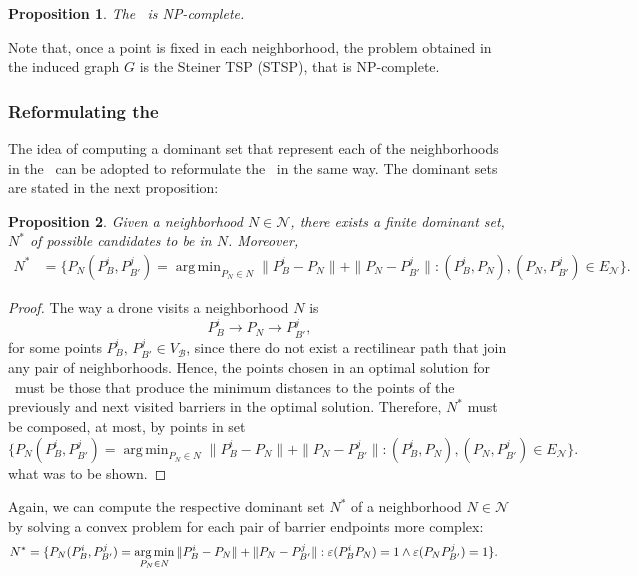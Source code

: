 \documentclass[a4paper]{elsarticle}
\DeclareMathOperator*{\argmin}{arg\,min}
\newcommand{\SPPN}{{\sf{H-SPPN}\xspace }}
\newcommand{\TSPN}{{\sf{H-TSPN}\xspace }}
\newcommand{\VB}{{V^{}_{\mathcal B}}}
\newcommand{\EN}{{E^{}_{\mathcal N}}}
\newtheorem{prop}{Proposition}
\begin{document}
	
	
		\begin{prop}
			The \TSPN \ is NP-complete.
		\end{prop}
		
		Note that, once a point is fixed in each neighborhood, the problem obtained in the induced graph $G$ is the Steiner TSP (STSP), that is NP-complete.
		
	
	\subsubsection{Reformulating the \TSPN}
	The idea of computing a dominant set that represent each of the neighborhoods in the \SPPN \ can be adopted to reformulate the \TSPN \ in the same way. The dominant sets are stated in the next proposition:
	
	\begin{prop}
		Given a neighborhood $N\in\mathcal N$, there exists a finite dominant set, $N^*$ of possible candidates to be in $N$. Moreover,
		\begin{align*}
			N^*&=\{P_N(P_{B}^i, P_{B'}^j)=\argmin_{P_N\in N} \|P_B^i - P_N\| + \|P_N - P_{B'}^j\| :(P_B^i, P_N), (P_N, P_{B'}^j)\in \EN\}.
		\end{align*}
	\end{prop}
	\begin{proof}
		The way a drone visits a neighborhood $N$ is
		$$P_{B}^i\longrightarrow P_N\longrightarrow P_{B'}^j,$$
		for some points $P_B^i,\, P_{B'}^j\in \VB$, since there do not exist a rectilinear path that join any pair of neighborhoods. Hence, the points chosen in an optimal solution for \TSPN \ must be those that produce the minimum distances to the points of the previously and next visited barriers in the optimal solution. Therefore, $N^*$ must be composed, at most, by points in set
		$$
			\{P_N(P_{B}^i, P_{B'}^j)=\argmin_{P_N\in N} \|P_B^i - P_N\| + \|P_N - P_{B'}^j\| :(P_B^i, P_N), (P_N, P_{B'}^j)\in \EN\}.
		$$
		what was to be shown.
	\end{proof}
		Again, we can compute the respective dominant set $N^*$ of a neighborhood $N\in\mathcal N$ by solving a convex problem for each pair of barrier endpoints more complex:
	\begin{align*}
		N^*&=\{P_N(P_{B}^i, P_{B'}^j)=\argmin_{P_N\in N} \|P_B^i - P_N\| + \|P_N - P_{B'}^j\| :\varepsilonvar{P_B^i}{P_N} = 1 \wedge \varepsilonvar{P_N}{P_{B'}^j} = 1\}.
	\end{align*}
	
\end{document}
